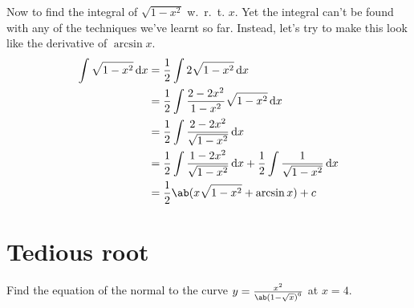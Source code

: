 Now to find the integral of \(\sqrt{1-x^2}\) w.~r.~t. \(x\). Yet the
integral can't be found with any of the techniques we've learnt so far.
Instead, let's try to make this look like the derivative of \(\arcsin x\).
\begin{align*}
	\int \sqrt{1-x^2} \odif{x} & = \frac{1}{2} \int 2\sqrt{1-x^2} \odif{x}                                                                  \\
	                           & = \frac{1}{2} \int \frac{2-2x^2}{1-x^2} \sqrt{1-x^2} \odif{x}                                              \\
	                           & = \frac{1}{2} \int \frac{2-2x^2}{\sqrt{1-x^2}} \odif{x}                                                    \\
	                           & = \frac{1}{2} \int \frac{1-2x^2}{\sqrt{1-x^2}} \odif{x} + \frac{1}{2} \int \frac{1}{\sqrt{1-x^2}} \odif{x} \\
	                           & = \frac{1}{2} \ab(x \sqrt{1-x^2} + \arcsin x) + c
\end{align*}

\section{Tedious root}
Find the equation of the normal to the curve \(y = \frac{x^2}{{\ab(1 - \sqrt{x})}^6}\)
at \(x = 4\).


